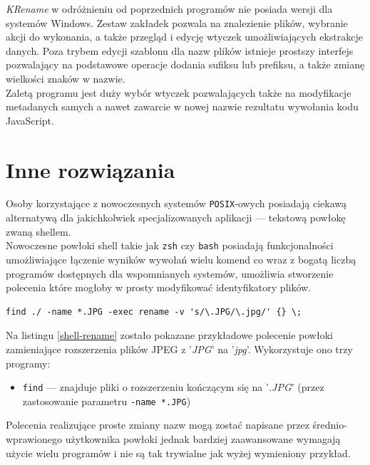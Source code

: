 \par
\textit{KRename} w odróżnieniu od poprzednich programów nie posiada wersji dla systemów Windows. Zestaw zakładek pozwala na znalezienie plików, wybranie akcji do wykonania, a także przegląd i edycję wtyczek umożliwiających ekstrakcje danych. Poza trybem edycji szablonu dla nazw plików istnieje prostszy interfejs pozwalający na podstawowe operacje dodania sufiksu lub prefiksu, a także zmianę wielkości znaków w nazwie.\\
Zaletą programu jest duży wybór wtyczek pozwalających także na modyfikacje metadanych samych a nawet zawarcie w nowej nazwie rezultatu wywołania kodu JavaScript.

\section{Inne rozwiązania}
\par
Osoby korzystające z nowoczesnych systemów \texttt{POSIX}-owych posiadają ciekawą alternatywą dla jakichkolwiek specjalizowanych aplikacji --- tekstową powłokę zwaną shellem.\\
Nowoczesne powłoki shell takie jak \texttt{zsh} czy \texttt{bash} posiadają funkcjonalności umożliwiające łączenie wyników wywołań wielu komend co wraz z bogatą liczbą programów dostępnych dla wspomnianych systemów, umożliwia stworzenie polecenia które mogłoby w prosty modyfikować identyfikatory plików.

\begin{lstlisting}[label=shell-rename, caption={Polecenie powłoki zmieniające roszerzenia plików JPEG}]
find ./ -name *.JPG -exec rename -v 's/\.JPG/\.jpg/' {} \;
\end{lstlisting}

\par
Na listingu \ref{shell-rename} zostało pokazane przykładowe polecenie powłoki zamieniające rozszerzenia plików JPEG z '\textit{JPG}' na '\textit{jpg}'.
Wykorzystuje ono trzy programy:
\begin{itemize}
\item \texttt{find} --- znajduje pliki o rozszerzeniu kończącym się na '\textit{.JPG}' (przez zastosowanie parametru \texttt{-name *.JPG})
\end{itemize}
Polecenia realizujące proste zmiany nazw mogą zostać napisane przez średnio-wprawionego użytkownika powłoki jednak bardziej zaawansowane wymagają użycie wielu programów i nie są tak trywialne jak wyżej wymieniony przykład.
